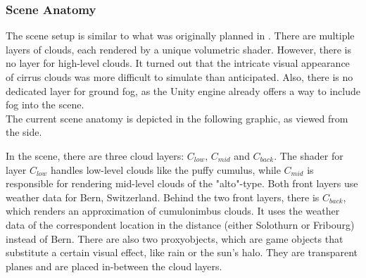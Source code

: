 \clearpage

\subsubsection{Scene Anatomy}
The scene setup is similar to what was originally planned in . There are multiple layers of clouds, each rendered by a unique \gls{volumetric} \gls{shader}.
However, there is no layer for high-level clouds. It turned out that the intricate visual appearance of cirrus clouds was more difficult to simulate than anticipated.
Also, there is no dedicated layer for ground fog, as the Unity engine already offers a way to include fog into the scene.
\\
The current scene anatomy is depicted in the following graphic, as viewed from the side.

\begin{figure}[H]
    \centering
    \label{img:tikz:techimpl:anatomy}
\end{figure}

\noindent
In the scene, there are three cloud layers: \color{red}$C_{low}$\color{black}, \color{red}$C_{mid}$ \color{black} and \color{red}$C_{back}$\color{black}.
The \gls{shader} for layer \color{red}$C_{low}$ \color{black} handles low-level clouds like the puffy cumulus, while \color{red}$C_{mid}$ \color{black} is responsible for rendering mid-level clouds of the "alto"-type.
Both front layers use weather data for Bern, Switzerland.
Behind the two front layers, there is \color{red}$C_{back}$\color{black}, which renders an approximation of cumulonimbus clouds. It uses the weather data of the correspondent location in the distance (either Solothurn or Fribourg) instead of Bern.
\emptyline
There are also two \gls{proxyobject}s, which are game objects that substitute a certain visual effect, like rain or the sun's halo.
They are transparent planes and are placed in-between the cloud layers.

